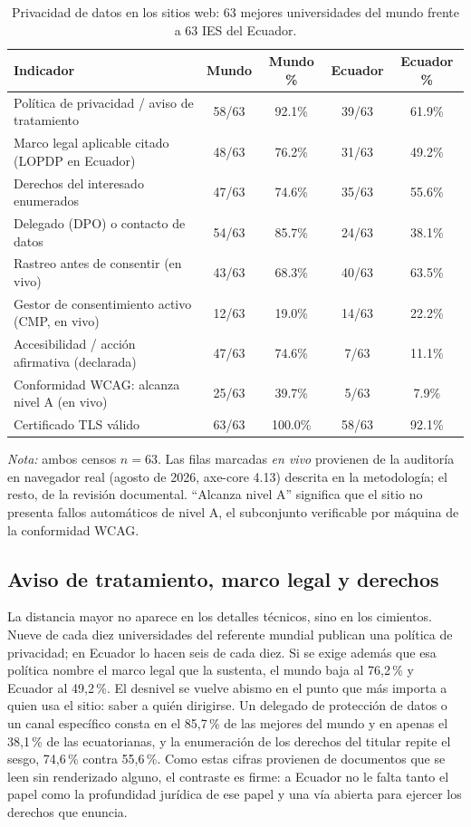 \documentclass[pdflatex,sn-basic,Numbered]{sn-jnl}
\theoremstyle{thmstyleone}
\theoremstyle{thmstyletwo}
\theoremstyle{thmstylethree}
\begin{document}
\begin{table}[htbp]
	\centering
	\caption{Privacidad de datos en los sitios web: 63 mejores universidades del mundo frente a 63 IES del Ecuador.}
	\label{tab:comp}
	\small
	\begin{tabular}{@{}p{5.6cm}cccc@{}}
		\toprule
		\textbf{Indicador} & \textbf{Mundo} & \textbf{Mundo \%} & \textbf{Ecuador} & \textbf{Ecuador \%} \\
		\midrule
	Pol\'itica de privacidad / aviso de tratamiento & 58/63 & 92.1\% & 39/63 & 61.9\% \\
	Marco legal aplicable citado (LOPDP en Ecuador) & 48/63 & 76.2\% & 31/63 & 49.2\% \\
	Derechos del interesado enumerados & 47/63 & 74.6\% & 35/63 & 55.6\% \\
	Delegado (DPO) o contacto de datos & 54/63 & 85.7\% & 24/63 & 38.1\% \\
	Rastreo antes de consentir (en vivo) & 43/63 & 68.3\% & 40/63 & 63.5\% \\
	Gestor de consentimiento activo (CMP, en vivo) & 12/63 & 19.0\% & 14/63 & 22.2\% \\
	Accesibilidad / acci\'on afirmativa (declarada) & 47/63 & 74.6\% & 7/63 & 11.1\% \\
	Conformidad WCAG: alcanza nivel A (en vivo) & 25/63 & 39.7\% & 5/63 & 7.9\% \\
	Certificado TLS v\'alido & 63/63 & 100.0\% & 58/63 & 92.1\% \\
		\bottomrule
	\end{tabular}
	\par\vspace{2pt}
	\footnotesize\RaggedRight\textit{Nota:} ambos censos $n=63$. Las filas marcadas \emph{en vivo} provienen de la auditor\'ia en navegador real (agosto de 2026, axe-core 4.13) descrita en la metodolog\'ia; el resto, de la revisi\'on documental. ``Alcanza nivel A'' significa que el sitio no presenta fallos autom\'aticos de nivel A, el subconjunto verificable por m\'aquina de la conformidad WCAG.
\end{table}

\subsection{Aviso de tratamiento, marco legal y derechos}
La distancia mayor no aparece en los detalles técnicos, sino en los cimientos. Nueve de cada diez universidades del referente mundial publican una política de privacidad; en Ecuador lo hacen seis de cada diez. Si se exige además que esa política nombre el marco legal que la sustenta, el mundo baja al 76,2\,\% y Ecuador al 49,2\,\%. El desnivel se vuelve abismo en el punto que más importa a quien usa el sitio: saber a quién dirigirse. Un delegado de protección de datos o un canal específico consta en el 85,7\,\% de las mejores del mundo y en apenas el 38,1\,\% de las ecuatorianas, y la enumeración de los derechos del titular repite el sesgo, 74,6\,\% contra 55,6\,\%. Como estas cifras provienen de documentos que se leen sin renderizado alguno, el contraste es firme: a Ecuador no le falta tanto el papel como la profundidad jurídica de ese papel y una vía abierta para ejercer los derechos que enuncia.
\end{document}
